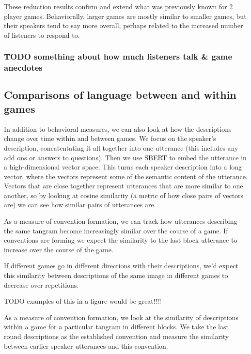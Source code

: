 \documentclass[
  english,
  a4paper,
]{article}
\begin{document}
These reduction results confirm and extend what was previously known for 2 player games. Behaviorally, larger games are mostly similar to smaller games, but their speakers tend to say more overall, perhaps related to the increased number of listeners to respond to.

\hypertarget{todo-something-about-how-much-listeners-talk-game-anecdotes}{%
\subsubsection{TODO something about how much listeners talk \& game anecdotes}\label{todo-something-about-how-much-listeners-talk-game-anecdotes}}

\hypertarget{comparisons-of-language-between-and-within-games}{%
\subsection{Comparisons of language between and within games}\label{comparisons-of-language-between-and-within-games}}

In addition to behavioral measures, we can also look at how the descriptions change over time within and between games. We focus on the speaker's description, concatentating it all together into one utterance (this includes any add ons or answers to questions). Then we use SBERT to embed the utterance in a high-dimensional vector space. This turns each speaker description into a long vector, where the vectors represent some of the semantic content of the utterance. Vectors that are close together represent utterances that are more similar to one another, so by looking at cosine similarity (a metric of how close pairs of vectors are) we can see how similar pairs of utterances are.

As a measure of convention formation, we can track how utterances describing the same tangram become increasingly similar over the course of a game. If conventions are forming we expect the similarity to the last block utterance to increase over the course of the game.

If different games go in different directions with their descriptions, we'd expect this similarity between descriptions of the same image in different games to decrease over repetitions.

TODO examples of this in a figure would be great!!!!

As a measure of convention formation, we look at the similarity of descriptions within a game for a particular tangram in different blocks. We take the last round descriptions as the established convention and measure the similarity between earlier speaker utterances and this convention.
\end{document}
